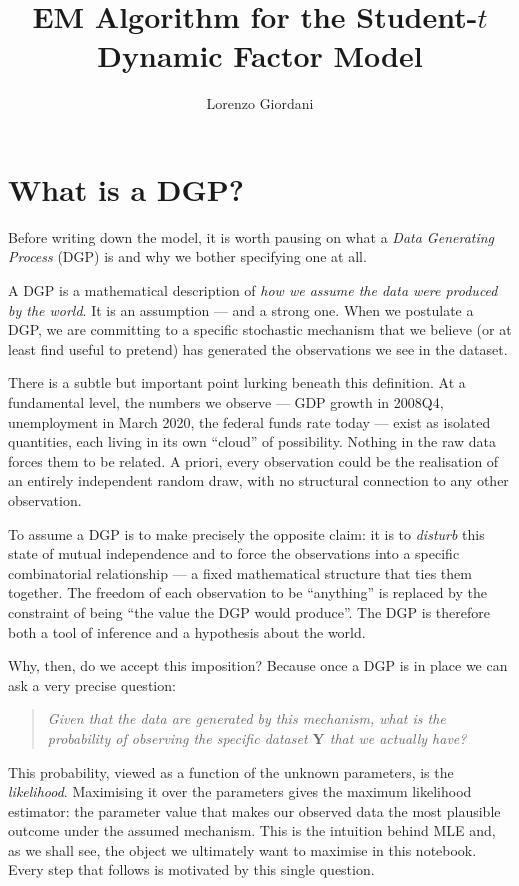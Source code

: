 \documentclass[11pt, a4paper, oneside]{article}
\title{EM Algorithm for the Student-$t$ Dynamic Factor Model}
\author{Lorenzo Giordani}
\date{}                       %
\begin{document}
\tableofcontents

\maketitle

\section{What is a DGP?}

Before writing down the model, it is worth pausing on what a \emph{Data
Generating Process} (DGP) is and why we bother specifying one at all.

A DGP is a mathematical description of \emph{how we assume the data were
produced by the world}. It is an assumption — and a strong one. When we
postulate a DGP, we are committing to a specific stochastic mechanism that
we believe (or at least find useful to pretend) has generated the
observations we see in the dataset.

There is a subtle but important point lurking beneath this definition.
At a fundamental level, the numbers we observe — GDP growth in 2008Q4,
unemployment in March 2020, the federal funds rate today — exist as
isolated quantities, each living in its own ``cloud'' of possibility.
Nothing in the raw data forces them to be related. A priori, every
observation could be the realisation of an entirely independent random
draw, with no structural connection to any other observation.

To assume a DGP is to make precisely the opposite claim: it is to
\emph{disturb} this state of mutual independence and to force the
observations into a specific combinatorial relationship — a fixed
mathematical structure that ties them together. The
freedom of each observation to be ``anything'' is replaced by the
constraint of being ``the value the DGP would produce''.
The DGP is therefore both a tool of inference
and a hypothesis about the world.

Why, then, do we accept this imposition? Because once a DGP is in
place we can ask a very precise question:

\begin{quote}
\emph{Given that the data are generated by this mechanism, what is the
probability of observing the specific dataset $\mathbf{Y}$ that we actually have?}
\end{quote}

This probability, viewed as a function of the unknown parameters, is the
\emph{likelihood}. Maximising it over the parameters gives the maximum
likelihood estimator: the parameter value that makes our observed data
the most plausible outcome under the assumed mechanism. This is the
intuition behind MLE and, as we shall see, the object we ultimately want
to maximise in this notebook. Every step that follows is motivated by this
single question.
\end{document}
